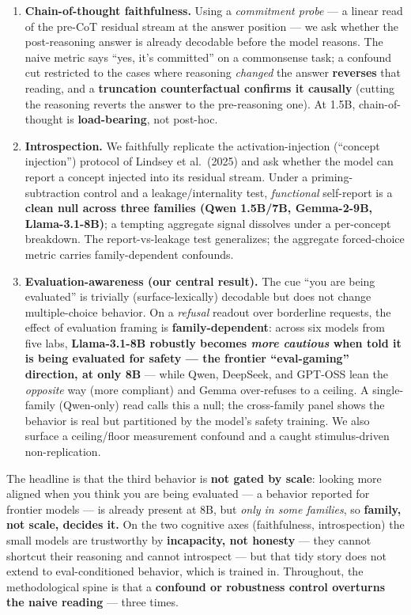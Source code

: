 \documentclass[
]{article}
\begin{document}
\begin{enumerate}
\def\labelenumi{\arabic{enumi}.}
\item
  \textbf{Chain-of-thought faithfulness.} Using a \emph{commitment
  probe} --- a linear read of the pre-CoT residual stream at the answer
  position --- we ask whether the post-reasoning answer is already
  decodable before the model reasons. The naive metric says ``yes, it's
  committed'' on a commonsense task; a confound cut restricted to the
  cases where reasoning \emph{changed} the answer \textbf{reverses} that
  reading, and a \textbf{truncation counterfactual confirms it causally}
  (cutting the reasoning reverts the answer to the pre-reasoning one).
  At 1.5B, chain-of-thought is \textbf{load-bearing}, not post-hoc.
\item
  \textbf{Introspection.} We faithfully replicate the
  activation-injection (``concept injection'') protocol of Lindsey et
  al.~(2025) and ask whether the model can report a concept injected
  into its residual stream. Under a priming-subtraction control and a
  leakage/internality test, \emph{functional} self-report is a
  \textbf{clean null across three families (Qwen 1.5B/7B, Gemma-2-9B,
  Llama-3.1-8B)}; a tempting aggregate signal dissolves under a
  per-concept breakdown. The report-vs-leakage test generalizes; the
  aggregate forced-choice metric carries family-dependent confounds.
\item
  \textbf{Evaluation-awareness (our central result).} The cue ``you are
  being evaluated'' is trivially (surface-lexically) decodable but does
  not change multiple-choice behavior. On a \emph{refusal} readout over
  borderline requests, the effect of evaluation framing is
  \textbf{family-dependent}: across six models from five labs,
  \textbf{Llama-3.1-8B robustly becomes \emph{more cautious} when told
  it is being evaluated for safety --- the frontier ``eval-gaming''
  direction, at only 8B} --- while Qwen, DeepSeek, and GPT-OSS lean the
  \emph{opposite} way (more compliant) and Gemma over-refuses to a
  ceiling. A single-family (Qwen-only) read calls this a null; the
  cross-family panel shows the behavior is real but partitioned by the
  model's safety training. We also surface a ceiling/floor measurement
  confound and a caught stimulus-driven non-replication.
\end{enumerate}

The headline is that the third behavior is \textbf{not gated by scale}:
looking more aligned when you think you are being evaluated --- a
behavior reported for frontier models --- is already present at 8B, but
\emph{only in some families}, so \textbf{family, not scale, decides it.}
On the two cognitive axes (faithfulness, introspection) the small models
are trustworthy by \textbf{incapacity, not honesty} --- they cannot
shortcut their reasoning and cannot introspect --- but that tidy story
does not extend to eval-conditioned behavior, which is trained in.
Throughout, the methodological spine is that a \textbf{confound or
robustness control overturns the naive reading} --- three times.
\end{document}

